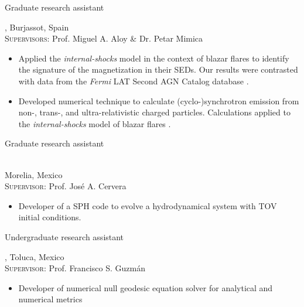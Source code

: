 %
{\DAAval}{Graduate research assistant}{}{}%
{\UVval, Burjassot, Spain\\
  \textsc{Supervisors}: Prof. Miguel A. Aloy \& Dr. Petar Mimica
  \begin{itemize}
    \item Applied the \emph{internal-shocks} model in the context of blazar flares to identify the signature of the magnetization in their SEDs. Our results were contrasted with data from the \emph{Fermi} LAT Second AGN Catalog database \cite{RuedaBecerril:2014mi}.
    \item Developed numerical technique to calculate (cyclo-)synchrotron emission from non-, trans-, and ultra-relativistic charged particles. Calculations applied to the \emph{internal-shocks} model of blazar flares \cite{RuedaBecerril:2017mi}.
  \end{itemize}
}
%
{\IFMes}{Graduate research assistant}{}{}%
{\UMSNHes\\
  Morelia, Mexico\\
  \textsc{Supervisor}: Prof. José A. Cervera
  \begin{itemize}
    \item Developer of a SPH code to evolve a hydrodynamical system with TOV initial conditions.
  \end{itemize}
}
%
{\FCes}{Undergraduate research assistant}{}{}%
{\UAEMes, Toluca, Mexico\\%
  \textsc{Supervisor}: Prof. Francisco S. Guzmán
  \begin{itemize}
    \item Developer of numerical null geodesic equation solver for analytical and numerical metrics \cite{Guzman:2009ru}
  \end{itemize}
}



